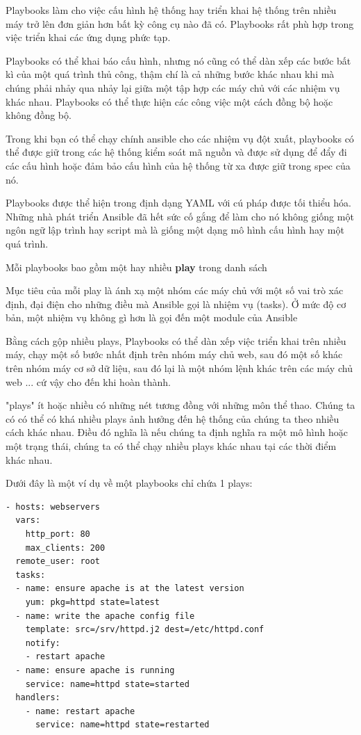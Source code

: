 Playbooks làm cho việc cấu hình hệ thống hay triển khai hệ thống trên nhiều máy trở lên đơn giản hơn bất kỳ công cụ nào đã có. Playbooks rất phù hợp trong việc triển khai các ứng dụng phức tạp.

Playbooks có thể khai báo cấu hình, nhưng nó cũng có thể dàn xếp các bước bất kì của một quá trình thủ công, thậm chí là cả những bước khác nhau khi mà chúng phải nhảy qua nhảy lại giữa một tập hợp các máy chủ với các nhiệm vụ khác nhau. Playbooks có thể thực hiện các công việc một cách đồng bộ hoặc không đồng bộ.

Trong khi bạn có thể chạy chính ansible cho các nhiệm vụ đột xuất, playbooks có thể được giữ trong các hệ thống kiểm soát mã nguồn và được sử dụng để đẩy đi các cấu hình hoặc đảm bảo cấu hình của hệ thống từ xa được giữ trong spec của nó.

Playbooks được thể hiện trong định dạng YAML với cú pháp được tối thiểu hóa. Những nhà phát triển Ansible đã hết sức cố gắng để làm cho nó không giống một ngôn ngữ lập trình hay script mà là giống một dạng mô hình cấu hình hay một quá trình.

Mỗi playbooks bao gồm một hay nhiều \textbf{play} trong danh sách

Mục tiêu của mỗi play là ánh xạ một nhóm các máy chủ với một số vai trò xác định, đại điện cho những điều mà Ansible gọi là nhiệm vụ (tasks). Ở mức độ cơ bản, một nhiệm vụ không gì hơn là gọi đến một module của Ansible

Bằng cách gộp nhiều plays, Playbooks có thể dàn xếp việc triển khai trên nhiều máy, chạy một số bước nhất định trên nhóm máy chủ web, sau đó một số khác trên nhóm máy cơ sở dữ liệu, sau đó lại là một nhóm lệnh khác trên các máy chủ web ... cứ vậy cho đến khi hoàn thành.

"plays" ít hoặc nhiều có những nét tương đồng với những môn thể thao. Chúng ta có có thể có khá nhiều plays ảnh hưởng đến hệ thống của chúng ta theo nhiều cách khác nhau. Điều đó nghĩa là nếu chúng ta định nghĩa ra một mô hình hoặc một trạng thái, chúng ta có thể chạy nhiều plays khác nhau tại các thời điểm khác nhau.

Dưới đây là một ví dụ về một playbooks chỉ chứa 1 plays:

\begin{lstlisting}[label={lst:ansible_playbook_example},caption={Ví dụ về playbooks của Ansible},morekeywords={hosts, vars, tasks, name, yum, http_port, max_clients, remote_user, template, service, handlers, notify, state, pkg, src, dest}]
- hosts: webservers
  vars:
    http_port: 80
    max_clients: 200
  remote_user: root
  tasks:
  - name: ensure apache is at the latest version
    yum: pkg=httpd state=latest
  - name: write the apache config file
    template: src=/srv/httpd.j2 dest=/etc/httpd.conf
    notify:
    - restart apache
  - name: ensure apache is running
    service: name=httpd state=started
  handlers:
    - name: restart apache
      service: name=httpd state=restarted
\end{lstlisting}

